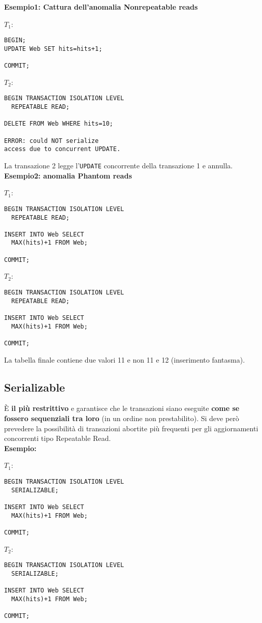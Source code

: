 \documentclass[a4paper, 10pt, titlepage]{article}
\begin{document}
			\noindent
			\textbf{Esempio1: Cattura dell'anomalia Nonrepeatable reads}
			\begin{multicols}{2}
			\noindent
			$ T_1 $:
			\begin{lstlisting}
BEGIN;
UPDATE Web SET hits=hits+1;

COMMIT;
			\end{lstlisting}
			\columnbreak
			$ T_2 $:
			\begin{lstlisting}
BEGIN TRANSACTION ISOLATION LEVEL
  REPEATABLE READ;

DELETE FROM Web WHERE hits=10;

ERROR: could NOT serialize 
access due to concurrent UPDATE.
			\end{lstlisting}
			\end{multicols} 
			La transazione 2 legge l'\lstinline|UPDATE| concorrente della transazione 1 e annulla. \medskip \\
			\textbf{Esempio2: anomalia Phantom reads}
			\begin{multicols}{2}
			\noindent
			$ T_1 $:
			\begin{lstlisting}
BEGIN TRANSACTION ISOLATION LEVEL
  REPEATABLE READ;
 
INSERT INTO Web SELECT
  MAX(hits)+1 FROM Web;
  
COMMIT;
			\end{lstlisting}
			\columnbreak
			$ T_2 $:
			\begin{lstlisting}
BEGIN TRANSACTION ISOLATION LEVEL
  REPEATABLE READ;

INSERT INTO Web SELECT
  MAX(hits)+1 FROM Web;

COMMIT;
			\end{lstlisting}
			\end{multicols}
La tabella finale contiene due valori 11 e non 11 e 12 (inserimento fantasma).
		
	\subsection{Serializable}
		È \textbf{il più restrittivo} e garantisce che le transazioni siano eseguite \textbf{come se fossero sequenziali tra loro} (in un ordine non prestabilito). Si deve però prevedere la possibilità di transazioni abortite più frequenti per gli aggiornamenti concorrenti tipo Repeatable Read.\\
		\textbf{Esempio:}
		\begin{multicols}{2}
		\noindent
		$ T_1 $:
		\begin{lstlisting}
BEGIN TRANSACTION ISOLATION LEVEL
  SERIALIZABLE;
  
INSERT INTO Web SELECT
  MAX(hits)+1 FROM Web;

COMMIT;
		\end{lstlisting}
		\columnbreak
		$ T_2 $:
		\begin{lstlisting}
BEGIN TRANSACTION ISOLATION LEVEL
  SERIALIZABLE;

INSERT INTO Web SELECT
  MAX(hits)+1 FROM Web;

COMMIT;
		\end{lstlisting}
		\end{multicols}
		
\end{document}
